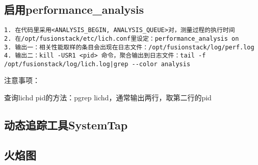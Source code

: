 \subsection{启用performance\_analysis}

\begin{lstlisting}
1. 在代码里采用<ANALYSIS_BEGIN, ANALYSIS_QUEUE>对，测量过程的执行时间
2. 在/opt/fusionstack/etc/lich.conf里设定：performance_analysis on
3. 输出一：相关性能取样的条目会出现在日志文件：/opt/fusionstack/log/perf.log
4. 输出二：kill -USR1 <pid> 命令，聚合输出到日志文件：tail -f /opt/fusionstack/log/lich.log|grep --color analysis
\end{lstlisting}

注意事项：
\begin{compactenum}
\item 查询lichd pid的方法：pgrep lichd，通常输出两行，取第二行的pid
\end{compactenum}

\subsection{动态追踪工具SystemTap}

\subsection{火焰图}

